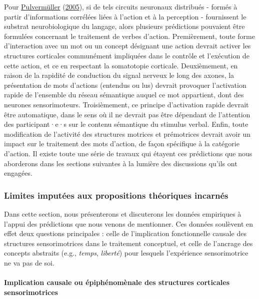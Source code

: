 \documentclass[
  a4paper,12pt,twoside,onecolumn,openright,final,oldfontcommands]{memoir}
\begin{document}
Pour \protect\hyperlink{ref-pulvermuller_brain_2005}{Pulvermüller} (\protect\hyperlink{ref-pulvermuller_brain_2005}{2005}), si de tels circuits neuronaux distribués - formés à partir d'informations corrélées liées à l'action et à la perception - fournissent le substrat neurobiologique du langage, alors plusieurs prédictions pouvaient être formulées concernant le traitement de verbes d'action. Premièrement, toute forme d'interaction avec un mot ou un concept désignant une action devrait activer les structures corticales communément impliquées dans le contrôle et l'exécution de cette action, et ce en respectant la somatotopie corticale. Deuxièmement, en raison de la rapidité de conduction du signal nerveux le long des axones, la présentation de mots d'actions (entendus ou lus) devrait provoquer l'activation rapide de l'ensemble du réseau sémantique auquel ce mot appartient, dont des neurones sensorimoteurs. Troisièmement, ce principe d'activation rapide devrait être automatique, dans le sens où il ne devrait pas être dépendant de l'attention des participant·e·s sur le contenu sémantique du stimulus verbal. Enfin, toute modification de l'activité des structures motrices et prémotrices devrait avoir un impact sur le traitement des mots d'action, de façon spécifique à la catégorie d'action. Il existe toute une série de travaux qui étayent ces prédictions que nous aborderons dans les sections suivantes à la lumière des discussions qu'ils ont engagées.

\hypertarget{challenge}{%
\subsubsection{Limites imputées aux propositions théoriques incarnés}\label{challenge}}

Dans cette section, nous présenterons et discuterons les données empiriques à l'appui des prédictions que nous venons de mentionner. Ces données soulèvent en effet deux questions principales : celle de l'implication fonctionnelle causale des structures sensorimotrices dans le traitement conceptuel, et celle de l'ancrage des concepts abstraits (e.g., \emph{temps}, \emph{liberté}) pour lesquels l'expérience sensorimotrice ne va pas de soi.

\hypertarget{epi}{%
\paragraph{Implication causale ou épiphénomènale des structures corticales sensorimotrices}\label{epi}}
\end{document}
